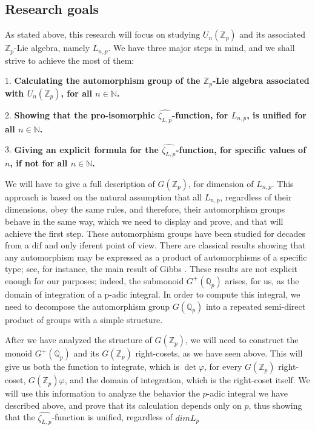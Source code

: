 \documentclass[12pt]{article}
\begin{document}
\subsection{Research goals}
As stated above, this research will focus on studying $U_n(\mathbb{Z}_p)$ and its associated $\mathbb{Z}_p$-Lie algebra, namely $L_{n,p}$. We have three major steps in mind, and we shall strive to achieve the most of them:\par
1. \textbf{Calculating the automorphism group of the $\mathbb{Z}_p$-Lie algebra associated with $U_n(\mathbb{Z}_p)$, for all $n\in\mathbb{N}$.}\par
2. \textbf{Showing that the pro-isomorphic $\hat{\zeta_{L,p}}$-function, for $L_{n,p}$, is unified for all $n\in\mathbb{N}$.}\par
3. \textbf{Giving an explicit formula for the $\hat{\zeta_{L,p}}$-function, for specific values of $n$, if not for all $n\in\mathbb{N}$.}\par
We will have to give a full description of $G(\mathbb{Z}_p)$, for dimension of $L_{n,p}$. This approach is based on the natural assumption that all $L_{n,p}$, regardless of their dimensions, obey the same rules, and therefore, their automorphism groups behave in the same way, which we need to display and prove, and that will achieve the first step.
These automorphism groups have been studied for decades from a dif and only iferent point of view.  There are classical results showing that any automorphism may be expressed as a product of automorphisms of a specific type; see, for instance, the main result of Gibbs \cite{Gibbs}.  These results are not explicit enough for our purposes; indeed, the submonoid $G^+(\mathbb{Q}_p)$ arises, for us, as the domain of integration of a p-adic integral.  In order to compute this integral, we need to decompose the automorphism group $G(\mathbb{Q}_p)$ into a repeated semi-direct product of groups with a simple structure.
\par
After we have analyzed the structure of $G(\mathbb{Z}_p)$, we will need to construct the monoid $G^{+}(\mathbb{Q}_p)$ and its $G(\mathbb{Z}_p)$ right-cosets, as we have seen above. This will give us both the function to integrate, which is $\det\varphi$, for every $G(\mathbb{Z}_p)$ right-coset, $G(\mathbb{Z}_p)\varphi$, and the domain of integration, which is the right-coset itself. We will use this information to analyze the behavior the $p$-adic integral we have described above, and prove that its calculation depends only on $p$, thus showing that the $\hat{\zeta_{L,p}}$-function is unified, regardless of $dimL_p$
\end{document}
